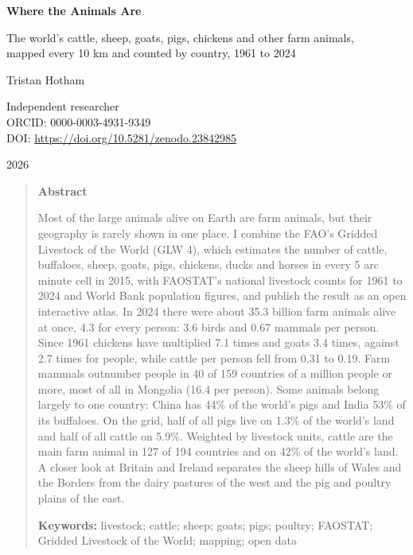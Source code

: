\documentclass[11pt,a4paper]{article}
\begin{document}
\begin{center}
{\Large\bfseries Where the Animals Are\par}
\vspace{0.4em}
{\large The world's cattle, sheep, goats, pigs, chickens and other farm animals,\\mapped every 10 km and counted by country, 1961 to 2024\par}
\vspace{1.2em}
{\large Tristan Hotham\par}
\vspace{0.3em}
{\small Independent researcher\\
ORCID: 0000-0003-4931-9349\\
DOI: \href{https://doi.org/10.5281/zenodo.23842985}{https://doi.org/10.5281/zenodo.23842985}\par}
\vspace{0.8em}
2026
\end{center}

\begin{quote}
\small
\begin{center}\textbf{Abstract}\end{center}
Most of the large animals alive on Earth are farm animals, but their geography is rarely shown in one place. I combine the FAO's Gridded Livestock of the World (GLW 4), which estimates the number of cattle, buffaloes, sheep, goats, pigs, chickens, ducks and horses in every 5 arc minute cell in 2015, with FAOSTAT's national livestock counts for 1961 to 2024 and World Bank population figures, and publish the result as an open interactive atlas. In 2024 there were about 35.3 billion farm animals alive at once, 4.3 for every person: 3.6 birds and 0.67 mammals per person. Since 1961 chickens have multiplied 7.1 times and goats 3.4 times, against 2.7 times for people, while cattle per person fell from 0.31 to 0.19. Farm mammals outnumber people in 40 of 159 countries of a million people or more, most of all in Mongolia (16.4 per person). Some animals belong largely to one country: China has 44\% of the world's pigs and India 53\% of its buffaloes. On the grid, half of all pigs live on 1.3\% of the world's land and half of all cattle on 5.9\%. Weighted by livestock units, cattle are the main farm animal in 127 of 194 countries and on 42\% of the world's land. A closer look at Britain and Ireland separates the sheep hills of Wales and the Borders from the dairy pastures of the west and the pig and poultry plains of the east.

\textbf{Keywords:} livestock; cattle; sheep; goats; pigs; poultry; FAOSTAT; Gridded Livestock of the World; mapping; open data
\end{quote}
\end{document}
